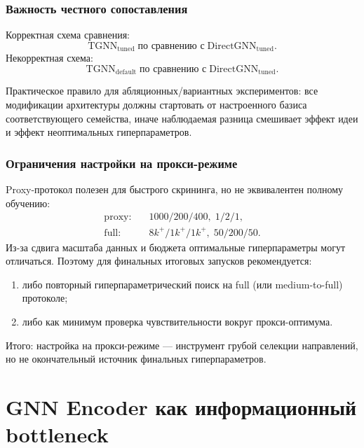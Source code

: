 \documentclass[11pt]{article}
\begin{document}
\subsubsection{Важность честного сопоставления}

Корректная схема сравнения:
\begin{equation*}
\mathrm{TGNN}_{\mathrm{tuned}} \;\text{по сравнению с}\; \mathrm{DirectGNN}_{\mathrm{tuned}}.
\end{equation*}
Некорректная схема:
\begin{equation*}
\mathrm{TGNN}_{\mathrm{default}} \;\text{по сравнению с}\; \mathrm{DirectGNN}_{\mathrm{tuned}}.
\end{equation*}

Практическое правило для абляционных/вариантных экспериментов: все модификации архитектуры должны стартовать от настроенного базиса соответствующего семейства, иначе наблюдаемая разница смешивает эффект идеи и эффект неоптимальных гиперпараметров.

\subsubsection{Ограничения настройки на прокси-режиме}

Proxy-протокол полезен для быстрого скрининга, но не эквивалентен полному обучению:
\begin{align*}
\text{proxy:}&\quad 1000/200/400,\; 1/2/1, \\
\text{full:}&\quad 8k^{+}/1k^{+}/1k^{+},\; 50/200/50.
\end{align*}
Из-за сдвига масштаба данных и бюджета оптимальные гиперпараметры могут отличаться. Поэтому для финальных итоговых запусков рекомендуется:
\begin{enumerate}
  \item либо повторный гиперпараметрический поиск на full (или medium-to-full) протоколе;
  \item либо как минимум проверка чувствительности вокруг прокси-оптимума.
\end{enumerate}

Итого: настройка на прокси-режиме --- инструмент грубой селекции направлений, но не окончательный источник финальных гиперпараметров.

\section{GNN Encoder как информационный bottleneck}
\label{sec:encoder-bottleneck}
\end{document}
